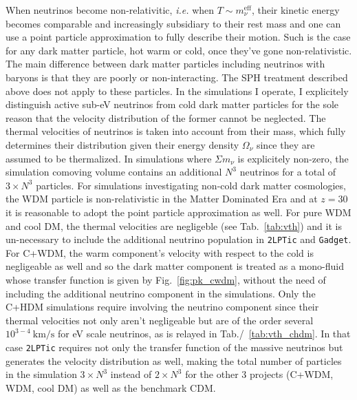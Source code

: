 When neutrinos become non-relativitic, \textit{i.e.} when $T \sim m_\nu^{\mathrm{eff}}$, their kinetic energy becomes comparable and increasingly subsidiary to their rest mass and one can use a point particle approximation to fully describe their motion. Such is the case for any dark matter particle, hot warm or cold, once they've gone non-relativistic.  The main difference between dark matter particles including neutrinos with baryons is that they are poorly or non-interacting. The SPH treatment described above does not apply to these particles. In the simulations I operate, I explicitely distinguish active sub-eV neutrinos from cold dark matter particles for the sole reason that the velocity distribution of the former cannot be neglected. The thermal velocities of neutrinos is taken into account from their mass, which fully determines their distribution given their energy density $\Omega_\nu$ since they are assumed to be thermalized. In simulations where $\Sigma m_\nu$ is explicitely non-zero, the simulation comoving volume contains an additional $N^3$ neutrinos for a total of $3\times N^3$ particles. For simulations investigating non-cold dark matter cosmologies, the WDM particle is non-relativistic in the Matter Dominated Era and at $z=30$ it is reasonable to adopt the point particle approximation as well. For pure WDM and cool DM, the thermal velocities are negligeble (see Tab.~\ref{tab:vth}) and it is un-necessary to include the additional neutrino population in \texttt{2LPTic} and \texttt{Gadget}. For C+WDM, the warm component's velocity with respect to the cold is negligeable as well and so the dark matter component is treated as a mono-fluid whose transfer function is given by Fig.~\ref{fig:pk_cwdm}, without the need of including the additional neutrino component in the simulations. Only the C+HDM simulations require involving the neutrino component since their thermal velocities not only aren't negligeable but are of the order several $10^{3-4}~\mathrm{km/s}$ for eV scale neutrinos, as is relayed in Tab./~\ref{tab:vth_chdm}. In that case \texttt{2LPTic} requires not only the transfer function of the massive neutrinos but generates the velocity distribution as well, making the total number of particles in the simulation $3 \times N^3$ instead of $2 \times N^3$ for the other 3 projects (C+WDM, WDM, cool DM) as well as the benchmark CDM.\\

